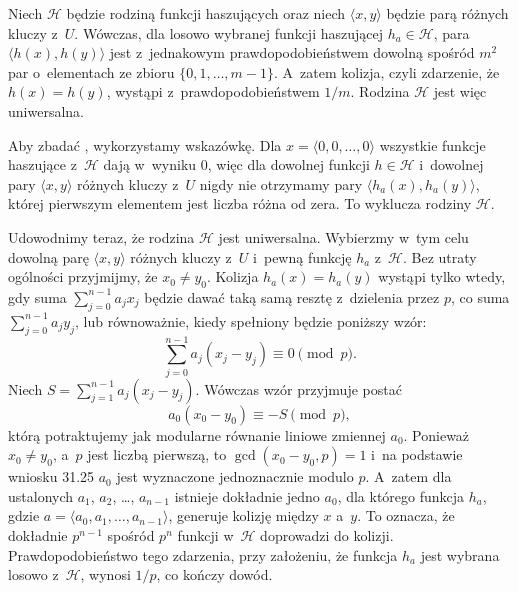 \bigskip
{}

\subproblem %
Niech $\mathcal{H}$ będzie  rodziną funkcji haszujących oraz niech $\langle x,y\rangle$ będzie parą różnych kluczy z~$U$.
Wówczas, dla losowo wybranej funkcji haszującej $h_a\in\mathcal{H}$, para $\langle h(x),h(y)\rangle$ jest z~jednakowym prawdopodobieństwem dowolną spośród $m^2$ par o~elementach ze zbioru $\{0,1,\dots,m-1\}$.
A~zatem kolizja, czyli zdarzenie, że $h(x)=h(y)$, wystąpi z~prawdopodobieństwem $1/m$.
Rodzina $\mathcal{H}$ jest więc uniwersalna.

\subproblem %
Aby zbadać , wykorzystamy wskazówkę.
Dla $x=\langle0,0,\dots,0\rangle$ wszystkie funkcje haszujące z~$\mathcal{H}$ dają w~wyniku 0, więc dla dowolnej funkcji $h\in\mathcal{H}$ i~dowolnej pary $\langle x,y\rangle$ różnych kluczy z~$U$ nigdy nie otrzymamy pary $\langle h_a(x),h_a(y)\rangle$, której pierwszym elementem jest liczba różna od zera.
To wyklucza  rodziny $\mathcal{H}$.

Udowodnimy teraz, że rodzina $\mathcal{H}$ jest uniwersalna.
Wybierzmy w~tym celu dowolną parę $\langle x,y\rangle$ różnych kluczy z~$U$ i~pewną funkcję $h_a$ z~$\mathcal{H}$.
Bez utraty ogólności przyjmijmy, że $x_0\ne y_0$.
Kolizja $h_a(x)=h_a(y)$ wystąpi tylko wtedy, gdy suma $\sum_{j=0}^{n-1}a_jx_j$ będzie dawać taką samą resztę z~dzielenia przez $p$, co suma $\sum_{j=0}^{n-1}a_jy_j$, lub równoważnie, kiedy spełniony będzie poniższy wzór:
\[
	\sum_{j=0}^{n-1}a_j(x_j-y_j) \equiv 0 \pmod p.
\]
Niech $S=\sum_{j=1}^{n-1}a_j(x_j-y_j)$.
Wówczas wzór przyjmuje postać
\[
	a_0(x_0-y_0) \equiv -S \pmod p,
\]
którą potraktujemy jak modularne równanie liniowe zmiennej $a_0$.
Ponieważ $x_0\ne y_0$, a~$p$ jest liczbą pierwszą, to $\gcd(x_0-y_0,p)=1$ i~na podstawie wniosku 31.25 $a_0$ jest wyznaczone jednoznacznie modulo $p$.
A~zatem dla ustalonych $a_1$, $a_2$, \dots, $a_{n-1}$ istnieje dokładnie jedno $a_0$, dla którego funkcja $h_a$, gdzie $a=\langle a_0,a_1,\dots,a_{n-1}\rangle$, generuje kolizję między $x$ a~$y$.
To oznacza, że dokładnie $p^{n-1}$ spośród $p^n$ funkcji w~$\mathcal{H}$ doprowadzi do kolizji.
Prawdopodobieństwo tego zdarzenia, przy założeniu, że funkcja $h_a$ jest wybrana losowo z~$\mathcal{H}$, wynosi $1/p$, co kończy dowód.

